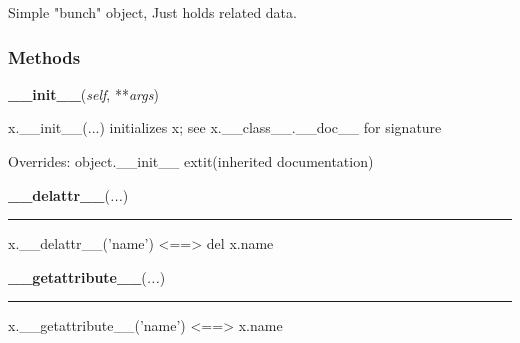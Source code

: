 Simple "bunch" object, Just holds related data.



  \subsubsection{Methods}

    \vspace{0.5ex}

    \begin{boxedminipage}{\textwidth}

    \raggedright \textbf{\_\_init\_\_}(\textit{self}, **\textit{args})

    x.\_\_init\_\_(...) initializes x; see x.\_\_class\_\_.\_\_doc\_\_ for 
    signature

    \vspace{1ex}

      Overrides: object.\_\_init\_\_ 	extit{(inherited documentation)}

    \end{boxedminipage}

    \label{object:__delattr__}

    \vspace{0.5ex}

    \begin{boxedminipage}{\textwidth}

    \raggedright \textbf{\_\_delattr\_\_}(\textit{...})

    \vspace{-1.5ex}

    \rule{\textwidth}{0.5\fboxrule}
    x.\_\_delattr\_\_('name') {\textless}=={\textgreater} del x.name

    \vspace{1ex}

    \end{boxedminipage}

    \label{object:__getattribute__}

    \vspace{0.5ex}

    \begin{boxedminipage}{\textwidth}

    \raggedright \textbf{\_\_getattribute\_\_}(\textit{...})

    \vspace{-1.5ex}

    \rule{\textwidth}{0.5\fboxrule}
    x.\_\_getattribute\_\_('name') {\textless}=={\textgreater} x.name

    \vspace{1ex}

    \end{boxedminipage}

